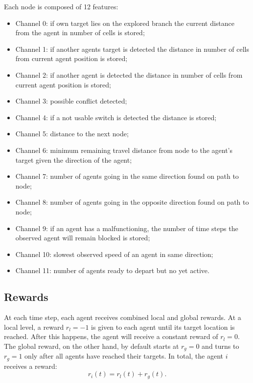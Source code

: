 \documentclass[a4paper, 12pt]{article}
\numberwithin{equation}{section}
\begin{document}
Each node is composed of 12 features:
\begin{itemize}
	\item Channel 0: if own target lies on the explored branch the current distance from the agent in number of cells is stored; 
	\item Channel 1: if another agents target is detected the distance in number of cells from current agent position is stored;
	\item Channel 2: if another agent is detected the distance in number of cells from current agent position is stored;
	\item Channel 3: possible conflict detected;
	\item Channel 4: if a not usable switch is detected the distance is stored;
	\item Channel 5: distance to the next node;
	\item Channel 6: minimum remaining travel distance from node to the agent’s target given the direction of the agent;
	\item Channel 7: number of agents going in the same direction found on path to node;
	\item Channel 8: number of agents going in the opposite direction found on path to node;
	\item Channel 9: if an agent has a malfunctioning, the number of time steps the observed agent will remain blocked is stored;
	\item Channel 10: slowest observed speed of an agent in same direction;
	\item Channel 11: number of agents ready to depart but no yet active.
\end{itemize}


\subsection[Rewards]{Rewards \cite{actions-rewards}}

At each time step, each agent receives combined local and global rewards. At a local level, a reward $r_l=-1$ is given to each agent until its target location is reached. After this happens, the agent will receive a constant reward of $r_l=0$. The global reward, on the other hand, by default starts at $r_g=0$ and turns to $r_g=1$ only after all agents have reached their targets. In total, the agent $i$ receives a reward:
\begin{equation}
	r_i\left(t\right)=r_l\left(t\right)+r_g\left(t\right).
\end{equation}
\end{document}
